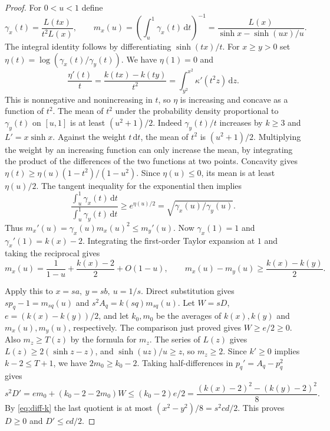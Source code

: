 \documentclass[10pt,twoside,reqno]{amsart}
\numberwithin{equation}{section}
\newcommand{\dd}{\,\mathrm{d}}
\begin{document}
\begin{proof}
For \(0<u<1\) define
\[
 \gamma_x(t)=\frac{L(tx)}{t^2 L(x)},\qquad
 m_x(u)=\left(\int_u^1\gamma_x(t)\dd t\right)^{-1}
       =\frac{L(x)}{\sinh x-\sinh(ux)/u}.
\]
The integral identity follows by differentiating \(\sinh(tx)/t\).
For \(x\ge y>0\) set \(\eta(t)=\log(\gamma_x(t)/\gamma_y(t))\).
We have \(\eta(1)=0\) and
\[
 \frac{\eta'(t)}t=\frac{k(tx)-k(ty)}{t^2}
       =\int_{y^2}^{x^2}\kappa'(t^2 z)\dd z.
\]
This is nonnegative and nonincreasing in \(t\), so \(\eta\) is increasing
and concave as a function of \(t^2\).
The mean of \(t^2\) under the probability density proportional to
\(\gamma_y(t)\) on \([u,1]\) is at least \((u^2+1)/2\).
Indeed \(\gamma_y(t)/t\) increases by \(k\ge3\) and \(L'=x\sinh x\).
Against the weight \(t\dd t\), the mean of \(t^2\) is \((u^2+1)/2\).
Multiplying the weight by an increasing function can only increase the
mean, by integrating the product of the differences of the two functions
at two points.
Concavity gives \(\eta(t)\ge\eta(u)(1-t^2)/(1-u^2)\).
Since \(\eta(u)\le0\), its mean is at least \(\eta(u)/2\).
The tangent inequality for the exponential then implies
\[
 \frac{\int_u^1\gamma_x(t)\dd t}{\int_u^1\gamma_y(t)\dd t}
 \ge e^{\eta(u)/2}=\sqrt{\gamma_x(u)/\gamma_y(u)} .
\]
Thus \(m_x'(u)=\gamma_x(u)m_x(u)^2\le m_y'(u)\).
Now \(\gamma_x(1)=1\) and \(\gamma_x'(1)=k(x)-2\). Integrating the
first-order Taylor expansion at \(1\) and taking the reciprocal gives
\[
 m_x(u)=\frac1{1-u}+\frac{k(x)-2}{2}+O(1-u),\qquad
 m_x(u)-m_y(u)\ge\frac{k(x)-k(y)}2 .
\]

Apply this to \(x=sa,\ y=sb,\ u=1/s\). Direct substitution gives
\(sp_q-1=m_{sq}(u)\) and \(s^2 A_q=k(sq)m_{sq}(u)\).
Let \(W=sD\), \(e=(k(x)-k(y))/2\), and let \(k_0,m_0\) be the averages
of \(k(x),k(y)\) and \(m_x(u),m_y(u)\), respectively.
The comparison just proved gives \(W\ge e/2\ge0\).
Also \(m_z\ge T(z)\) by the formula for \(m_z\).
The series of \(L(z)\) gives \(L(z)\ge2(\sinh z-z)\), and
\(\sinh(uz)/u\ge z\), so \(m_z\ge2\).
Since \(k'\ge0\) implies \(k-2\le T+1\), we have \(2m_0\ge k_0-2\).
Taking half-differences in \(p_q'=A_q-p_q^2\) gives
\[
 s^2D'=e m_0+(k_0-2-2m_0)W
       \le (k_0-2)e/2
       =\frac{(k(x)-2)^2-(k(y)-2)^2}{8}.
\]
By \eqref{eq:diff-k} the last quotient is at most
\((x^2-y^2)/8=s^2cd/2\). This proves \(D\ge0\) and \(D'\le cd/2\).


\end{proof}
\end{document}
